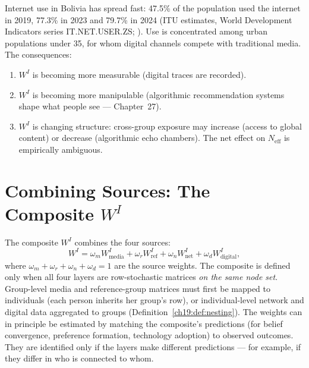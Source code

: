 \documentclass[../structural_economics_book.tex]{subfiles}
\begin{document}
\begin{remark}\label{ch21:prop:digital}
Internet use in Bolivia has spread fast: 47.5\% of the population used the internet in 2019, 77.3\% in 2023 and 79.7\% in 2024 (ITU estimates, World Development Indicators series IT.NET.USER.ZS; \citealp{worldbank2026wdi}). Use is concentrated among urban populations under 35, for whom digital channels compete with traditional media. %
The consequences:
\begin{enumerate}
\item $W^I$ is becoming more measurable (digital traces are recorded).
\item $W^I$ is becoming more manipulable (algorithmic recommendation systems shape what people see --- Chapter~27).
\item $W^I$ is changing structure: cross-group exposure may increase (access to global content) or decrease (algorithmic echo chambers). The net effect on $N_{\text{eff}}$ is empirically ambiguous.
\end{enumerate}
\end{remark}


\section{Combining Sources: The Composite $W^I$}
\label{ch21:sec:composite}

\begin{definition}\label{ch21:def:composite_WI}
The composite $W^I$ combines the four sources:
\begin{equation}\label{ch21:eq:composite_WI}
W^I = \omega_m W^I_{\text{media}} + \omega_r W^I_{\text{ref}} + \omega_n W^I_{\text{net}} + \omega_d W^I_{\text{digital}},
\end{equation}
where $\omega_m + \omega_r + \omega_n + \omega_d = 1$ are the source weights. The composite is defined only when all four layers are row-stochastic matrices \emph{on the same node set}. Group-level media and reference-group matrices must first be mapped to individuals (each person inherits her group's row), or individual-level network and digital data aggregated to groups (Definition~\ref{ch19:def:nesting}). The weights can in principle be estimated by matching the composite's predictions (for belief convergence, preference formation, technology adoption) to observed outcomes. They are identified only if the layers make different predictions --- for example, if they differ in who is connected to whom.
\end{definition}
\end{document}

